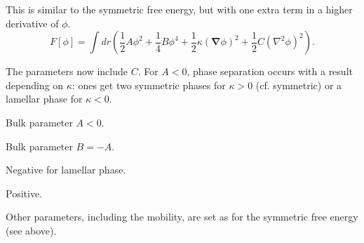 
This is similar to the symmetric free energy, but with one extra term
in a higher derivative of $\phi$.
\begin{equation}
 F[\phi] = 
\int dr \left(
{\textstyle \frac{1}{2}}A\phi^2
+ {\textstyle \frac{1}{4}}B\phi^4
+ {\textstyle \frac{1}{2}}\kappa (\mathbf{\nabla}\phi)^2
+ {\textstyle \frac{1}{2}} C (\nabla^2 \phi)^2 \right).
\end{equation}

The parameters now include $C$. For $A<0$, phase separation occurs
with a result depending on $\kappa$: ones get two symmetric phases
for $\kappa >0$ (cf. symmetric) or a lamellar phase for
$\kappa < 0$.

 Bulk parameter $A < 0$.

 Bulk parameter $B = -A$.

 Negative for lamellar phase.

 Positive.

Other parameters, including the mobility, are set as for the
symmetric free energy (see above).




